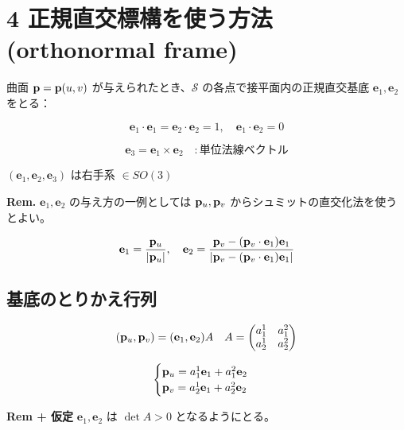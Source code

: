 \documentclass[a4paper,11pt]{jsarticle}
\numberwithin{equation}{section}
\begin{document}
\section*{4 正規直交標構を使う方法 (orthonormal frame)}

曲面 $\vb{p} = \vb{p}(u, v)$ が与えられたとき、$\mathcal{S}$ の各点で接平面内の正規直交基底 $\mathbf{e}_1, \mathbf{e}_2$ をとる：

\begin{equation}
\mathbf{e}_1 \cdot \mathbf{e}_1 = \mathbf{e}_2 \cdot \mathbf{e}_2 = 1, \quad \mathbf{e}_1 \cdot \mathbf{e}_2 = 0
\end{equation}

\begin{equation}
\mathbf{e}_3 = \mathbf{e}_1 \times \mathbf{e}_2 \quad : \text{単位法線ベクトル}
\end{equation}

$(\mathbf{e}_1, \mathbf{e}_2, \mathbf{e}_3)$ は右手系 $\in SO(3)$

\textbf{Rem.} $\mathbf{e}_1, \mathbf{e}_2$ の与え方の一例としては $\vb{p}_u, \vb{p}_v$ からシュミットの直交化法を使うとよい。

\begin{equation}
\mathbf{e}_1 = \frac{\vb{p}_u}{|\vb{p}_u|}, \quad \mathbf{e}_2 = \frac{\vb{p}_v - (\vb{p}_v \cdot \mathbf{e}_1)\mathbf{e}_1}{|\vb{p}_v - (\vb{p}_v \cdot \mathbf{e}_1)\mathbf{e}_1|}
\end{equation}

\subsection*{基底のとりかえ行列}

\begin{equation}
(\vb{p}_u, \vb{p}_v) = (\mathbf{e}_1, \mathbf{e}_2) A \quad A = 
\begin{pmatrix}
a_1^1 & a_1^2 \\
a_2^1 & a_2^2
\end{pmatrix}
\end{equation}

\begin{equation}
\begin{cases}
\vb{p}_u = a_1^1 \mathbf{e}_1 + a_1^2 \mathbf{e}_2 \\
\vb{p}_v = a_2^1 \mathbf{e}_1 + a_2^2 \mathbf{e}_2
\end{cases}
\end{equation}

\textbf{Rem + 仮定} $\mathbf{e}_1, \mathbf{e}_2$ は $\det A > 0$ となるようにとる。
\end{document}
